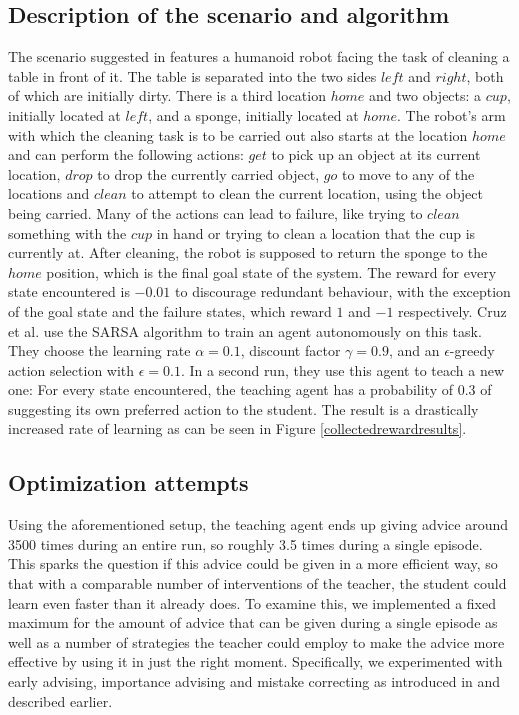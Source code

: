\documentclass[12pt,twoside]{article}
\theoremstyle{plain}
\theoremstyle{definition}
\theoremstyle{remark}
\begin{document}
\subsection{Description of the scenario and algorithm}
The scenario suggested in \cite{cruz2014improving} features a humanoid robot facing the task of cleaning a table in front of it. The table is separated into the two sides $left$ and $right$, both of which are initially dirty. There is a third location $home$ and two objects: a $cup$, initially located at $left$, and a sponge, initially located at $home$. The robot's arm with which the cleaning task is to be carried out also starts at the location $home$ and can perform the following actions: $get$ to pick up an object at its current location, $drop$ to drop the currently carried object, $go$ to move to any of the locations and $clean$ to attempt to clean the current location, using the object being carried. Many of the actions can lead to failure, like trying to $clean$ something with the $cup$ in hand or trying to clean a location that the cup is currently at. After cleaning, the robot is supposed to return the sponge to the $home$ position, which is the final goal state of the system. The reward for every state encountered is $-0.01$ to discourage redundant behaviour, with the exception of the goal state and the failure states, which reward $1$ and $-1$ respectively.
Cruz et al. use the SARSA algorithm to train an agent autonomously on this task. They choose the learning rate $\alpha = 0.1$, discount factor $\gamma = 0.9$, and an $\epsilon$-greedy action selection with $\epsilon = 0.1$. In a second run, they use this agent to teach a new one: For every state encountered, the teaching agent has a probability of $0.3$ of suggesting its own preferred action to the student. The result is a drastically increased rate of learning as can be seen in Figure \ref{collectedrewardresults}.

\subsection{Optimization attempts}

Using the aforementioned setup, the teaching agent ends up giving advice around 3500 times during an entire run, so roughly 3.5 times during a single episode. This sparks the question if this advice could be given in a more efficient way, so that with a comparable number of interventions of the teacher, the student could learn even faster than it already does. To examine this, we implemented a fixed maximum for the amount of advice that can be given during a single episode as well as a number of strategies the teacher could employ to make the advice more effective by using it in just the right moment. Specifically, we experimented with early advising, importance advising and mistake correcting as introduced in \cite{Taylor2014reinforcement} and described earlier.
\end{document}
